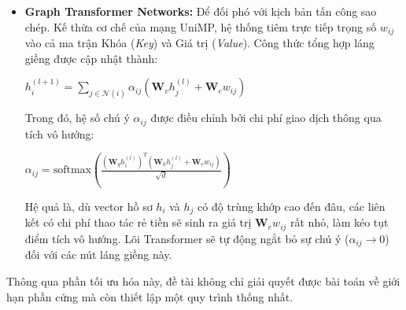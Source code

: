 \begin{itemize}[label={--}, itemsep=5pt]
\begin{itemize}[label={+}, itemsep=4pt]
            \item \textbf{Graph Transformer Networks:} Để đối phó với kịch bản tấn công sao chép. Kế thừa cơ chế của mạng UniMP, hệ thống tiêm trực tiếp trọng số $w_{ij}$ vào cả ma trận Khóa (\textit{Key}) và Giá trị (\textit{Value}). Công thức tổng hợp láng giềng được cập nhật thành:
            \begin{center}
            \(
                h_i^{(l+1)} = \sum_{j \in \mathcal{N}(i)} \alpha_{ij} \left( \mathbf{W}_v h_j^{(l)} + \mathbf{W}_e w_{ij} \right)
             \)
            \end{center}
            Trong đó, hệ số chú ý $\alpha_{ij}$ được điều chỉnh bởi chi phí giao dịch thông qua tích vô hướng:
            \begin{center}
            \(
                \alpha_{ij} = \text{softmax} \left( \frac{(\mathbf{W}_q h_i^{(l)})^T (\mathbf{W}_k h_j^{(l)} + \mathbf{W}_e w_{ij})}{\sqrt{d}} \right)
             \)
            \end{center}
            Hệ quả là, dù vector hồ sơ $h_i$ và $h_j$ có độ trùng khớp cao đến đâu, các liên kết có chi phí thao tác rẻ tiền sẽ sinh ra giá trị $\mathbf{W}_e w_{ij}$ rất nhỏ, làm kéo tụt điểm tích vô hướng. Lõi Transformer sẽ tự động ngắt bỏ sự chú ý ($\alpha_{ij} \rightarrow 0$) đối với các nút láng giềng này.

            \end{itemize}
        \end{itemize}

Thông qua phần tối ưu hóa này, đề tài không chỉ giải quyết được bài toán về giới hạn phần cứng mà còn thiết lập một quy trình thống nhất.